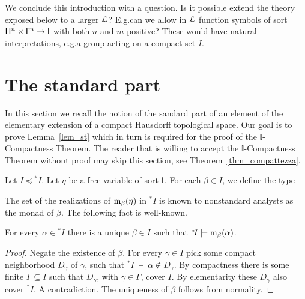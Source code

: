 \documentclass[10pt,oneside]{amsproc}
\renewcommand*{\emph}[1]{%
   \smash{\tikz[baseline]\node[rectangle, fill=teal!25, rounded corners, inner xsep=0.5ex, inner ysep=0.2ex, anchor=base, minimum height = 2.7ex]{#1};}}
\begin{document}
We conclude this introduction with a question.
Is it possible extend the theory exposed below to a larger ${\EuScript L}$?
E.g.\@ can we allow in ${\EuScript L}$ function symbols of sort ${\sf H}^n\times {\sf I}^m\to {\sf I}$ with both $n$ and $m$ positive?
These would have natural interpretations, e.g.\@ a group acting on a compact set $I$.

\section{The standard part}\label{standard_part}

In this section we recall the notion of the sandard part of an element of the elementary extension of a compact Hausdorff topological space.
Our goal is to prove Lemma~\ref{lem_st} which in turn is required for the proof of the $\mathds{I}$-Compactness Theorem.
The reader that is willing to accept the $\mathds{I}$-Compactness Theorem without proof may skip this section, see Theorem~\ref{thm_compattezza}.


Let $I\preceq{}^*\!I$.
Let $\eta$ be a free variable of sort ${\sf I}$.
For each $\beta\in I$, we define the type


The set of the realizations of ${\rm m}_\beta(\eta)$ in ${}^*\!I$ is known to nonstandard analysts as the monad of $\beta$. 
The following fact is well-known.

\begin{fact}\label{fact_uniqueness_st}
  For every $\alpha\in{}^*\!I$ there is a unique $\beta\in I$ such that ${}^*\!I\models{\rm m}_\beta(\alpha)$.
\end{fact}

\begin{proof}
  Negate the existence of $\beta$.
  For every $\gamma\in I$ pick some compact neighborhood $D_\gamma$ of $\gamma$, such that ${}^*\!I\ \models\ \alpha\notin D_\gamma$.
  By compactness there is some finite $\Gamma\subseteq I$ such that $D_\gamma$, with $\gamma\in\Gamma$, cover $I$.
  By elementarity these $D_{\gamma}$ also cover ${}^*\!I$.
  A contradiction.
  The uniqueness of $\beta$ follows from normality.
\end{proof}
\end{document}
